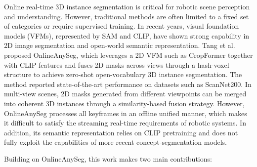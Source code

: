 \documentclass[12pt,a4paper]{article}
\begin{document}
Online real-time 3D instance segmentation is critical for robotic scene perception and understanding. However, traditional methods are often limited to a fixed set of categories or require supervised training. In recent years, visual foundation models (VFMs), represented by SAM and CLIP, have shown strong capability in 2D image segmentation and open-world semantic representation. Tang et al. proposed OnlineAnySeg, which leverages a 2D VFM such as CropFormer together with CLIP features and fuses 2D masks across views through a hash-voxel structure to achieve zero-shot open-vocabulary 3D instance segmentation. The method reported state-of-the-art performance on datasets such as ScanNet200. In multi-view scenes, 2D masks generated from different viewpoints can be merged into coherent 3D instances through a similarity-based fusion strategy. However, OnlineAnySeg processes all keyframes in an offline unified manner, which makes it difficult to satisfy the streaming real-time requirements of robotic systems. In addition, its semantic representation relies on CLIP pretraining and does not fully exploit the capabilities of more recent concept-segmentation models.

Building on OnlineAnySeg, this work makes two main contributions:
\end{document}
